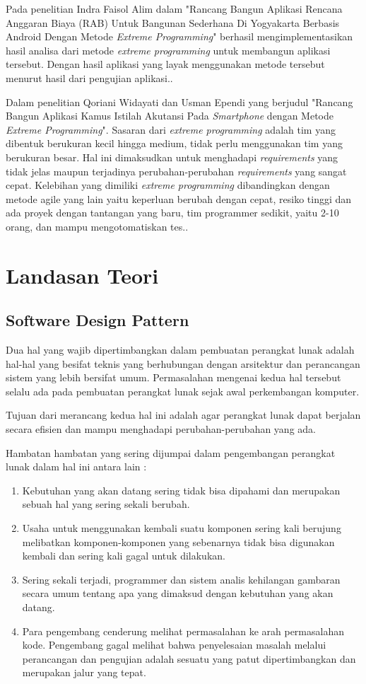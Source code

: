 \begin{spacing}{2}
  Pada penelitian Indra Faisol Alim dalam "Rancang Bangun Aplikasi Rencana Anggaran Biaya (RAB) Untuk Bangunan Sederhana Di Yogyakarta Berbasis Android Dengan Metode \emph{Extreme Programming}" berhasil mengimplementasikan hasil analisa dari metode \emph{extreme programming} untuk membangun aplikasi tersebut. Dengan hasil aplikasi yang layak menggunakan metode tersebut menurut hasil dari pengujian aplikasi.\cite{rab2016}.

  Dalam penelitian Qoriani Widayati dan Usman Ependi yang berjudul "Rancang Bangun Aplikasi Kamus Istilah Akutansi Pada \emph{Smartphone} dengan Metode \emph{Extreme Programming}". Sasaran dari \emph{extreme programming} adalah tim yang dibentuk berukuran kecil hingga medium, tidak perlu menggunakan tim yang berukuran besar. Hal ini dimaksudkan untuk menghadapi \emph{requirements} yang tidak jelas maupun terjadinya perubahan-perubahan \emph{requirements} yang sangat cepat. Kelebihan yang dimiliki \emph{extreme programming} dibandingkan dengan metode agile yang lain yaitu keperluan berubah dengan cepat, resiko tinggi dan ada proyek dengan tantangan yang baru, tim programmer sedikit, yaitu 2-10 orang, dan mampu mengotomatiskan tes.\cite{kamus-akuntansi2014}.

\section{Landasan Teori}
  \subsection{Software Design Pattern}
    Dua hal yang wajib dipertimbangkan dalam pembuatan perangkat lunak adalah hal-hal yang besifat teknis yang berhubungan dengan arsitektur dan perancangan sistem yang lebih bersifat umum. Permasalahan mengenai kedua hal tersebut selalu ada pada pembuatan perangkat lunak sejak awal perkembangan komputer.

    Tujuan dari merancang kedua hal ini adalah agar perangkat lunak dapat berjalan secara efisien dan mampu menghadapi perubahan-perubahan yang ada.

    Hambatan hambatan yang sering dijumpai dalam pengembangan perangkat lunak dalam hal ini antara lain :
    \begin{enumerate}
      \item Kebutuhan yang akan datang sering tidak bisa dipahami dan merupakan sebuah hal yang sering sekali berubah.
      \item Usaha untuk menggunakan kembali suatu komponen sering kali berujung melibatkan komponen-komponen yang sebenarnya tidak bisa digunakan kembali dan sering kali gagal untuk dilakukan.
      \item Sering sekali terjadi, programmer dan sistem analis kehilangan gambaran secara umum tentang apa yang dimaksud dengan kebutuhan yang akan datang.
      \item Para pengembang cenderung melihat permasalahan ke arah permasalahan kode. Pengembang gagal melihat bahwa penyelesaian masalah melalui perancangan dan pengujian adalah sesuatu yang patut dipertimbangkan dan merupakan jalur yang tepat.
    \end{enumerate}


\end{spacing}
